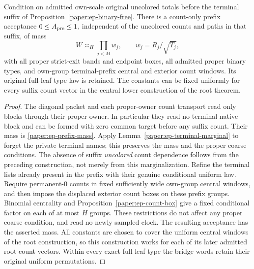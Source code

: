 \begin{proposition}
\label{paper:ep-prefix-source}
Condition on admitted own-scale original uncolored totals before the
terminal suffix of Proposition~\ref{paper:ep-binary-free}.
There is a count-only prefix acceptance $0\leq A_{\rm pre}\leq1$,
independent of the uncolored counts and paths in that suffix, of mass
\begin{equation}\label{paper:ep-prefix-mass}
 W\asymp_H\prod_{j<M}w_j,\qquad w_j=R_j/\sqrt{T_j},
\end{equation}
with all proper strict-exit bands and endpoint boxes, all admitted
proper binary types, and own-group terminal-prefix central and
exterior count windows.  Its original full-leaf type law is retained.
The constants can be fixed uniformly for every suffix count vector
in the central lower construction of the root theorem.
\end{proposition}
\begin{proof}
The diagonal packet and each proper-owner count transport read only
blocks through their proper owner.  In particular they read no
terminal native block and can be formed with zero common target
before any suffix count.  Their mass is
\eqref{paper:ep-prefix-mass}.  Apply
Lemma~\ref{paper:ep-terminal-marginal} to forget the private terminal
names; this preserves the mass and the proper coarse conditions.
The absence of suffix \emph{uncolored} count dependence follows from
the preceding construction, not merely from this marginalization.
Refine the terminal lists already present in the prefix with their
genuine conditional uniform law.  Require permanent-$0$ counts in
fixed sufficiently wide own-group central windows, and then impose
the displaced exterior count boxes on these prefix groups.
Binomial centrality and Proposition~\ref{paper:ep-count-box} give
a fixed conditional factor on each of at most $H$ groups.  These
restrictions do not affect any proper coarse condition, and read no
newly sampled clock.  The resulting acceptance has the asserted mass.
All constants are chosen to cover the uniform central windows of
the root construction, so this construction works for each of its
later admitted root count vectors.  Within every exact full-leaf type
the bridge words retain their original uniform permutations.
\end{proof}

